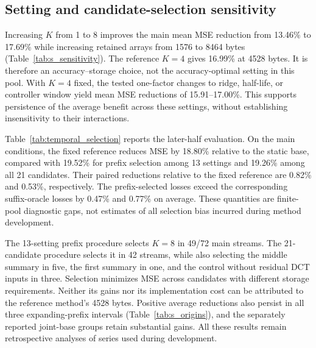 \subsection{Setting and candidate-selection sensitivity}
Increasing $K$ from 1 to 8 improves the main mean MSE reduction from 13.46\% to 17.69\% while increasing retained arrays from 1576 to 8464 bytes (Table~\ref{tab:s_sensitivity}). The reference $K=4$ gives 16.99\% at 4528 bytes. It is therefore an accuracy--storage choice, not the accuracy-optimal setting in this pool. With $K=4$ fixed, the tested one-factor changes to ridge, half-life, or controller window yield mean MSE reductions of 15.91--17.00\%. This supports persistence of the average benefit across these settings, without establishing insensitivity to their interactions.

Table~\ref{tab:temporal_selection} reports the later-half evaluation. On the main conditions, the fixed reference reduces MSE by 18.80\% relative to the static base, compared with 19.52\% for prefix selection among 13 settings and 19.26\% among all 21 candidates. Their paired reductions relative to the fixed reference are 0.82\% and 0.53\%, respectively. The prefix-selected losses exceed the corresponding suffix-oracle losses by 0.47\% and 0.77\% on average. These quantities are finite-pool diagnostic gaps, not estimates of all selection bias incurred during method development.

The 13-setting prefix procedure selects $K=8$ in 49/72 main streams. The 21-candidate procedure selects it in 42 streams, while also selecting the middle summary in five, the first summary in one, and the control without residual DCT inputs in three. Selection minimizes MSE across candidates with different storage requirements. Neither its gains nor its implementation cost can be attributed to the reference method's 4528 bytes. Positive average reductions also persist in all three expanding-prefix intervals (Table~\ref{tab:s_origins}), and the separately reported joint-base groups retain substantial gains. All these results remain retrospective analyses of series used during development.

\begin{table}[!tbp]
\caption{Later-half MSE reductions (\%) relative to each group's static base. Fixed uses the reference throughout; Prefix chooses using the earlier half; Oracle chooses using the scored later half. Pools contain 13 setting variants or all 21 candidates. Main/Sites average 72/4 condition-wise reductions; MAE/SF joint groups average 12 reductions after averaging seed losses. These intervals differ from the full-period evaluation.}
\label{tab:temporal_selection}
\centering

\end{table}

